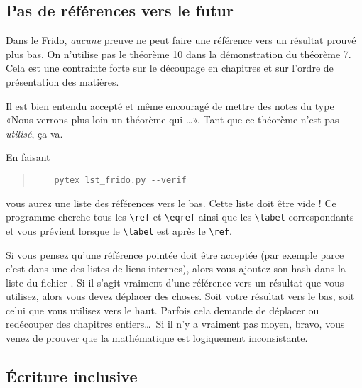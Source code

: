 \subsection{Pas de références vers le futur}

Dans le Frido, \emph{aucune} preuve ne peut faire une référence vers un résultat prouvé plus bas. On n'utilise pas le théorème 10 dans la démonstration du théorème 7. Cela est une contrainte forte sur le découpage en chapitres et sur l'ordre de présentation des matières.

Il est bien entendu accepté et même encouragé de mettre des notes du type «Nous verrons plus loin un théorème qui \ldots». Tant que ce théorème n'est pas \emph{utilisé}, ça va.

En faisant
\begin{quote}
    \begin{verbatim}
    pytex lst_frido.py --verif
    \end{verbatim}
\end{quote}
vous aurez une liste des références vers le bas. Cette liste doit être vide ! Ce programme cherche tous les \verb+\ref+ et \verb+\eqref+ ainsi que les \verb+\label+ correspondants et vous prévient lorsque le \verb+\label+ est après le \verb+\ref+.

Si vous pensez qu'une référence pointée doit être acceptée (par exemple parce c'est dans une des listes de liens internes), alors vous ajoutez son hash dans la liste du fichier . Si il s'agit vraiment d'une référence vers un résultat que vous utilisez, alors vous devez déplacer des choses. Soit votre résultat vers le bas, soit celui que vous utilisez vers le haut. Parfois cela demande de déplacer ou redécouper des chapitres entiers\ldots\ Si il n'y a vraiment pas moyen, bravo, vous venez de prouver que la mathématique est logiquement inconsistante.

\subsection{Écriture inclusive}

